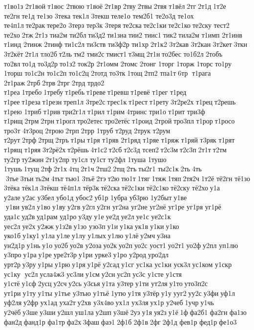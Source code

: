 т1во1з 
2т1вой 	т1вос 	2твою 	т1воё 2т1вр 2тву 2твы 2твя 	т1вёл 2тг 2т1д 1т2е 	те2гн те1д 	те1зо 	3тека 	тек1л 	3текш теле1о 
тем2б1 
те2о3д 	те1ох 
те4п1л те2рак тере2о 	3терз 	тер3к 	3теря те2ска те2с1ки те2с1ко те2ску 	тест2 	те2хо 2тж 2т1з 	тиа2м 	ти2бл ти3д2 ти1зна тии2 	тиис1 тик2 тила2м 	т1имп 
2т1инв 	т1инд 	2тинж 	2тинф 
ти1с2л ти3ств 
ти3ф2р 	ти1хр 2т1к2 
3т2кав 
3т2кан 
3т2кет 3ткн 
3т2кёт 2т1л 	тло2б т2ль тм2 	тми2с тмист1 т3мщ 2т1н то2бес 
то1б2л 	2тобъ 	то2вл то1д 
то3д2р то1з2 	ток2р 
2т1омм 	2томс 	2тонг 	1торг 	1торж 	1торс 	то1ру 	1торш 
то1с2н 
то1с2п 
то1с2ц 	2тотд 	то3тк 1тощ 2тп2 	тпа1т 6тр  т1рага 
2т1раж 2трб 2трв 2трг 2трд 	трдо2 	т1реа 1требо 1требу т1ребь т1реве т1ревш т1ревё 	т1рег 	т1ред 	т1рее т1реза т1резн треп1л 
3тре2с трес1к т1рест т1рету 3т2ре2х 	т1рец т2решь 	т1рею 	1триб 	т1рив три2г1л 	т1рил 	т1рим 4тринс 	три1о 	т1рит 	три3ф 	т1рищ 2трм 2трн т1рогл тро2етес тро2етёс т1роид 	2трой тро3пл 	т1рор т1росо 	тро3т 
4т3роц 	2трою 2трп 2трр 	1труб 	т2руд 	2трук 	т2рум 	т2рут 2трф 2трщ 2тръ т1ры т1ря  	т1ряв 
2т1ряд 	т1ряе 	т1ряж 	т1ряй 	т3ряк 	т1рят 	т1рящ 	т1ряя 3т2рё2х т2рёшь 4т1с2 т2сб т2с3д 	тсеп2 т2с3м т2с3п 2т1т т2тм 	ту2гр ту2жин 2т1у2пр 	ту1сл 	ту1ст 	ту2фл 	1туша 	1тушо 	1тушь 1тущ 2тф 2т1х 4тц 2т1ч 2тш2 2тщ 2тъ ты2г1 
ты2с1к 2ть 4ть  3тье 3тьи ть2м 4тьт тью1 3тьё 2тэ т2ю тю1т 1тяг 1тяж 1тяп 2тя2ч 1т2ё 	тё2гн 	тё1зо 	3тёка 	тёк1л 	3тёкш 
тё4п1л 	тёр3к тё2ска тё2с1ки тё2с1ко тё2ску 	тё2хо у1а 	у2але у2ас 	у3бел 	убо1д 	убос2 уб1р 	1убра 	уб3рю 
1у2быт у1ве  у1ви ув2л у1во у1ву у2гв у2гл у2гн 	уг2на 	уг2не 	уг2нё 	уг1ре 	уг1ря 	уг1рё 	уда1с уд2в уд1рам 	уд1ро у3ду у1е уе2д уе2л уе1с 
уе2с1к 	уес2л уе2х у2жж у1з2в у1зо 	узо3п у1и у1ка ук1в у1ки у1ко 	уко1б у1ку1 у1ла у1ле у1лу 	у1лых у1лю у1лё у2мч у3на 
ун2д1р у1нь у1о уо2б уо2в 	у2оза уо2к уо2п уо2с 	уост1 уо2т1 уо2ф у2пл 	уп1лю 	у3про у1ра у1ре уре2т3р у1ри 	урке3 у1ро 	у2род уро2дл 	урт2р у3ру у1ры у1рю у1ря у1рё 	у2сад у1сг 	ус1ка 	ус1ки 	уск3л ус1ком 	у1скр 
ус1ку  ус2л усла4ж3 	ус3ли у1см у2сн ус2п ус3с 	у1сте 	у1стя 	у1стё у1сф 2усц у2сч у2сь 	у3сья у1та 	у3тер у1ти 	ут2ля у1то уто3п2с 	ут1ри у1ту у1ты 	у1тье 	у3тью 	у1тьё 1утю у1тя 	у3тёр у1у ууг2 уу2с у3фи уф1л 	уф2ля у2фр 	ух1ад 	уха2т у2хв 
у3х4во ух1л 	ух3ля ух1р 	у2чеб 1учр у1чь 	у2чёб у3ше у3ши у2шл 	уш1ла у2шп у3шё 2уэ у1я уя2з у1ё 1ф фа2б1 	фа2гн 	фа1зо 	фан2д фанд1р 	фа1тр фа2х 3фаш фаэ1 2ф1б 2ф1в 2фг 2ф1д 	фев1р 	фед1р фе1о3 
